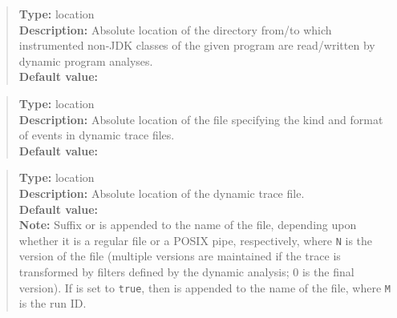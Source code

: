 \begin{quote}
{\bf Type:} location  \\
{\bf Description:} Absolute location of the directory from/to which instrumented non-JDK classes of the given program are read/written by dynamic program analyses. \\
{\bf Default value:} 
\end{quote}

\begin{quote}
{\bf Type:} location \\
{\bf Description:} Absolute location of the file specifying the kind and format of events in dynamic trace files. \\
{\bf Default value:} 
\end{quote}

\begin{quote}
{\bf Type:} location  \\
{\bf Description:} Absolute location of the dynamic trace file.  \\
{\bf Default value:}  \\
{\bf Note:} Suffix  or  is appended to the name of the file, depending upon whether it is a regular file or a POSIX pipe, respectively, where {\tt N} is the version of the file (multiple versions are maintained if the trace is transformed by filters defined by the dynamic analysis; 0 is the final version).  If  is set to {\tt true}, then  is appended to the name of the file, where {\tt M} is the run ID. 
\end{quote}



